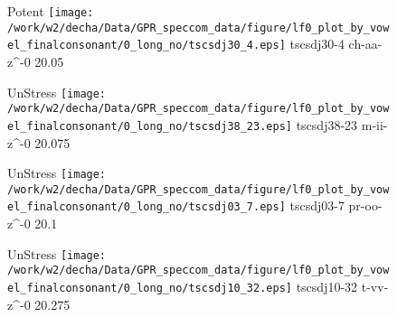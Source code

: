 \documentclass{article}
\begin{document}
\begin{figure}[t]
\begin{minipage}[b]{.24\textwidth}
\colorbox{Apricot}{Potent}
\centering
\texttt{[image: /work/w2/decha/Data/GPR\_speccom\_data/figure/lf0\_plot\_by\_vowel\_finalconsonant/0\_long\_no/tscsdj30\_4.eps]}
tscsdj30-4 ch-aa-z\textasciicircum-0 20.05
\end{minipage}
\begin{minipage}[b]{.24\textwidth}
UnStress
\centering
\texttt{[image: /work/w2/decha/Data/GPR\_speccom\_data/figure/lf0\_plot\_by\_vowel\_finalconsonant/0\_long\_no/tscsdj38\_23.eps]}
tscsdj38-23 m-ii-z\textasciicircum-0 20.075
\end{minipage}
\begin{minipage}[b]{.24\textwidth}
UnStress
\centering
\texttt{[image: /work/w2/decha/Data/GPR\_speccom\_data/figure/lf0\_plot\_by\_vowel\_finalconsonant/0\_long\_no/tscsdj03\_7.eps]}
tscsdj03-7 pr-oo-z\textasciicircum-0 20.1
\end{minipage}
\begin{minipage}[b]{.24\textwidth}
UnStress
\centering
\texttt{[image: /work/w2/decha/Data/GPR\_speccom\_data/figure/lf0\_plot\_by\_vowel\_finalconsonant/0\_long\_no/tscsdj10\_32.eps]}
tscsdj10-32 t-vv-z\textasciicircum-0 20.275
\end{minipage}
\end{figure}
\end{document}
